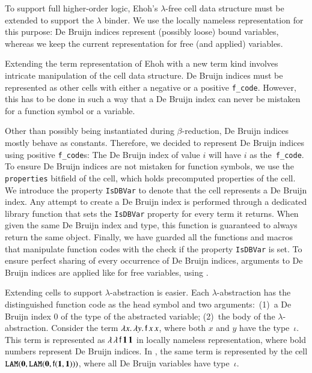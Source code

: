  To support full
higher-order logic, Ehoh's $\lambda$-free cell data structure must
be extended to support the $\lambda$ binder. We use the locally nameless
representation \cite{ac-12-locally-nameless} for this purpose: De Bruijn indices
represent (possibly loose) bound variables, whereas we keep the current
representation for free (and applied) variables.

Extending the term representation of Ehoh with a new term
kind involves intricate manipulation of the cell data structure. De Bruijn
indices must be represented as other cells with either a negative or a positive
\texttt{f\_code}. However, this has to be done in such a way that a De Bruijn
index can never be mistaken for a function symbol or a variable.

Other than possibly being instantiated during $\beta$-reduction, De Bruijn
indices mostly behave as constants. Therefore, we decided to represent De
Bruijn indices using positive \texttt{f\_code}s: The De Bruijn index of value $i$
will have $i$ as the~\verb|f_code|. To ensure De Bruijn indices are not
mistaken for function symbols, we use the \texttt{properties} bitfield of the
cell, which holds precomputed properties of %
the cell. We introduce the
property \texttt{IsDBVar} to denote that the cell represents a De
Bruijn index. Any attempt to create a De Bruijn index is performed through
a dedicated library function that sets the \texttt{IsDBVar} property for every term it
returns. When given the same De Bruijn index and type, this function is
guaranteed to always return the same object. Finally, we have guarded all the
functions and macros that manipulate function codes with the check if the
property \texttt{IsDBVar} is set. To ensure perfect sharing of every occurrence
of De Bruijn indices, arguments to De Bruijn indices are applied like for free
variables, using \internalat{}.

Extending cells to support $\lambda$-abstraction is easier. Each
$\lambda$-ab\-strac\-tion has the distinguished function code \internallam{} as the head
symbol and two arguments:\ (1)~a De Bruijn index 0 of the type of the abstracted variable;
(2)~the body %
of the $\lambda$-abstraction. Consider
the term $\lambda x. \, \lambda y.\, \mathsf{f}\, x \, x$, where both $x$ and $y$ have
the type~$\iota$. This term is represented as $\lambda\,\lambda\, \mathsf{f} \,
\mathbf{1} \, \mathbf{1}$ in locally nameless representation, where bold numbers
represent De Bruijn indices. In \ehohii{}, the same term is represented by the cell
$\texttt{LAM}(\mathbf{0}, \texttt{LAM}(\mathbf{0}, \mathsf{f}(\mathbf{1}, \mathbf{1})))$,
where all De Bruijn variables have type~$\iota$. 

